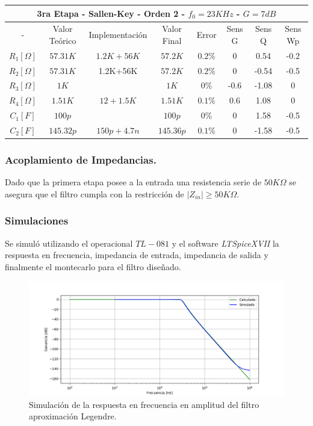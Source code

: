 \begin{table}[H]
\centering
\begin{tabular}{@{}cccccccc@{}}
\multicolumn{8}{c}{3ra Etapa - Sallen-Key - Orden 2 - $f_0 = 23KHz$ - $G=7dB$} \\ \midrule
- & Valor Teórico & Implementación & Valor Final & Error & Sens G & Sens Q & Sens Wp \\ \midrule
$R_1 [\Omega]$ & $57.31K$ & $1.2K+56K$ & $57.2K$ & $0.2\%$ & 0 & 0.54 & -0.2 \\
$R_2 [\Omega]$ & $57.31K$ & 1.2K+56K & $57.2K$ & $0.2\%$ & 0 & -0.54 & -0.5 \\
$R_3 [\Omega]$ & $1K$ &  & $1K$ & $0\%$ & -0.6 & -1.08 & 0 \\
$R_4 [\Omega]$ & $1.51K$ & $12+1.5K$ & $1.51K$ & $0.1\%$ & 0.6 & 1.08 & 0 \\
$C_1 [F]$ & $100p$ &  & $100p$ & $0\%$ & 0 & 1.58 & -0.5 \\
$C_2 [F]$ & $145.32p$ & $150p+4.7n$ & $145.36p$ & $0.1\%$ & 0 & -1.58 & -0.5 \\ \bottomrule
\end{tabular}
\end{table}

\subsubsection{Acoplamiento de Impedancias.}
Dado que la primera etapa posee a la entrada una resistencia serie de $50K\Omega$ se asegura que el filtro cumpla con la restricción de $|Z_{in}| \geq 50K\Omega$.

\subsubsection{Simulaciones}

Se simuló utilizando el operacional $TL-081$ y el software \textit{LTSpiceXVII} la respuesta en frecuencia, impedancia de entrada, impedancia de salida y finalmente el montecarlo para el filtro diseñado.

\begin{figure}[H]
\centering
	\centering
	\includegraphics[width=\textwidth]{Imagenes-Ej1/legendre_hs_sim.png}
	\caption{Simulación de la respuesta en frecuencia en amplitud del filtro aproximación Legendre.}
	\label{leg_gain_sim}
\end{figure}

